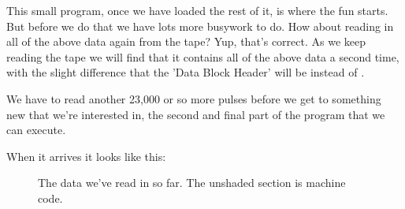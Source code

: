This small program, once we have loaded the rest of it, is where the fun starts. But before we do that we have lots more
busywork to do. How about reading in all of the above data again from the tape? Yup, that's correct. As we keep
reading the tape we will find that it contains all of the above data a second time, with the slight difference that the 'Data
Block Header' will be  instead of .

We have to read another 23,000 or so more pulses before we get to something new that we're interested in, the second and final part of
the program that we can execute.

When it arrives it looks like this:

\begin{figure}[H]
  {
    \setlength{\tabcolsep}{3.0pt}
    \setlength\cmidrulewidth{\heavyrulewidth} %
    \begin{adjustbox}{width=10cm,center}
    \end{adjustbox}
  }\caption{The data we've read in so far. The unshaded section is machine code.}
\end{figure}

